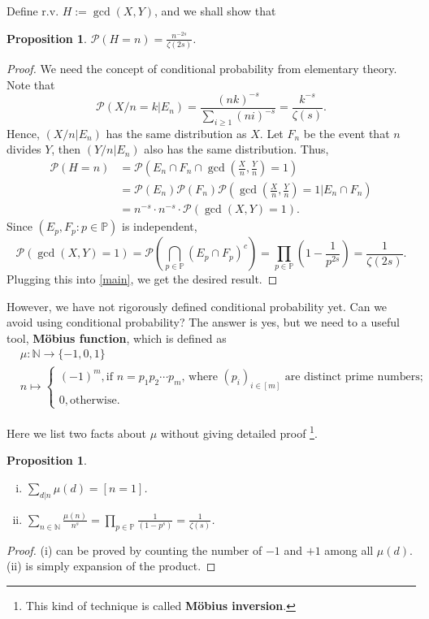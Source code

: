 \documentclass[12pt]{article}
\newtheorem{proposition}[theorem]{Proposition}
\newcommand\N{\mathbb{N}}
\newcommand\pp{\mathcal{P}}
\newcommand\PP{\mathbb{P}}
\newcommand\pr[1]{\mathcal{P} \left( #1\right)}
\begin{document}
Define r.v. $H := \gcd(X,Y)$, and we shall show that
\begin{proposition} \label{gcd}
    $\pp(H = n) = \frac{n^{-2s}}{\zeta(2s)}$.
\end{proposition}
\begin{proof}
    We need the concept of conditional probability 
    from elementary theory. Note that 
    $$
        \pr{X/n = k| E_n}
        = \frac{(nk)^{-s}}{\sum_{i \geq 1}(ni)^{-s}} 
        = \frac{k^{-s}}{\zeta(s)}.
    $$
    Hence, $(X/n | E_n)$ has the same distribution as $X$.
    Let $F_n$ be the event that $n$ divides $Y$, 
    then $(Y/n|E_n)$ also has the same distribution.
    Thus,
    \begin{equation} \label{main}
    \begin{aligned}
        \pp(H = n) &= \pr{E_n \cap F_n \cap {\gcd (\frac{X}{n},\frac{Y}{n}) = 1}} \\
         &= \pp(E_n) \pp(F_n) \pr{\gcd (\frac{X}{n},\frac{Y}{n}) = 1 | E_n \cap F_n} \\
         &= n^{-s} \cdot n^{-s} \cdot \pp(\gcd(X,Y) = 1).
    \end{aligned}
    \end{equation}
    Since $(E_p,F_p: p\in\PP)$ is independent, 
    $$
        \pp(\gcd(X,Y) = 1) = \pp(\bigcap_{p \in \PP}(E_p \cap F_p)^c)
        = \prod_{p\in \PP} (1 - \frac{1}{p^{2s}}) = \frac{1}{\zeta(2s)}.
    $$
    Plugging this into \cref{main}, we get the desired result.
\end{proof}

However, we have not rigorously defined conditional probability yet.
Can we avoid using conditional probability?
The answer is yes, but we need to a useful tool, \textbf{Möbius function},
which is defined as 
\begin{align*}
    &\mu : \N \to \{-1,0,1\} \\
     &n \mapsto \begin{cases}
        (-1)^{m}, \text{if $n = p_1p_2\cdots p_m$, where $(p_i)_{i \in [m]}$ are distinct prime numbers};\\
        0, \text{otherwise}.
    \end{cases}
\end{align*}

Here we list two facts about $\mu$ without giving detailed proof
\footnote{This kind of technique is called \textbf{Möbius inversion}.}.
\begin{proposition} \label{mu} 
    \begin{enumerate}[(i)]
        \item $\sum_{d|n} \mu(d) = [n = 1]$.
        \item $\sum_{n \in \N} \frac{\mu(n)}{n^s} 
        = \prod_{p \in \PP} \frac{1}{(1 - p^{s})} = \frac{1}{\zeta(s)}$.
    \end{enumerate}
\end{proposition} 
\begin{proof}
    (i) can be proved by counting the number of $-1$ and $+1$
    among all $\mu(d)$. (ii) is simply expansion of the product.
\end{proof}
\end{document}
